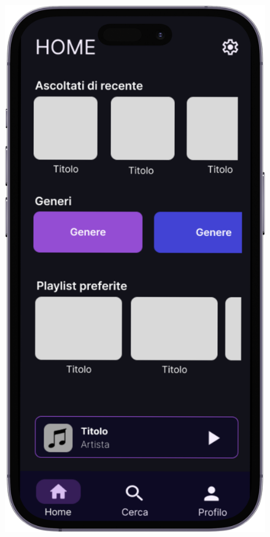 \documentclass{article}
\begin{document}
\begin{figure}[htbp]
\begin{minipage}{0.18\textwidth}
					\includegraphics[width=\textwidth]{foto3}
				\end{minipage}
				\hfill
				\begin{minipage}{0.18\textwidth}

\end{minipage}
\end{figure}
\end{document}
